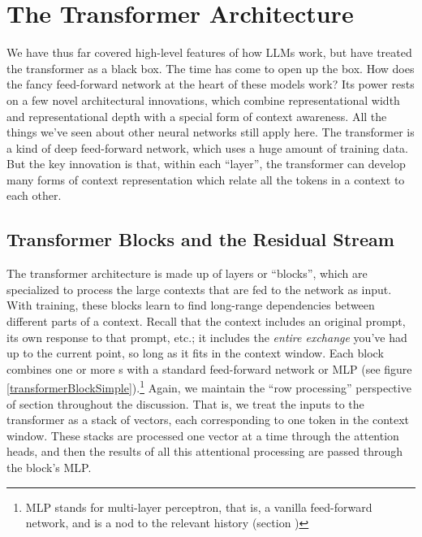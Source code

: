 \section{The Transformer Architecture}\label{transformers}


 
We have thus far covered high-level features of how LLMs work, but have treated
the transformer as a black box. The time has come to open up the box. How does
the fancy feed-forward network at the heart of these models work? Its power
rests on a few novel architectural innovations, which combine representational
width and representational depth with a special form of context awareness. All
the things we've seen about other neural networks still apply here. The
transformer is a kind of deep feed-forward network, which uses a huge amount of
training data. But the key innovation is that, within each ``layer'', the
transformer can develop many forms of context representation which relate all
the tokens in a context to each other.

\subsection{Transformer Blocks and the Residual Stream}

The transformer architecture \cite{vaswani2017attention} is made up of layers
or ``blocks'', which are specialized to process the large contexts that are fed
to the network as input. With training, these blocks learn to find long-range
dependencies between different parts of a context. Recall that the context
includes an original prompt, its own response to that prompt, etc.; it includes
the \emph{entire exchange} you've had up to the current point, so long
as it fits in the context window. Each block combines one or more s with a standard feed-forward network or MLP (see figure \ref{transformerBlockSimple}).\footnote{MLP stands for multi-layer perceptron, that is, a vanilla feed-forward network, and is a nod to the relevant history (section )}
Again, we maintain the ``row processing'' perspective of section
 throughout the discussion. That is, we treat the inputs to the transformer as a stack of vectors, each corresponding to one token in the context window. These stacks are processed one vector at a time through the attention heads, and then the results of all this attentional processing are passed through the block's MLP.

